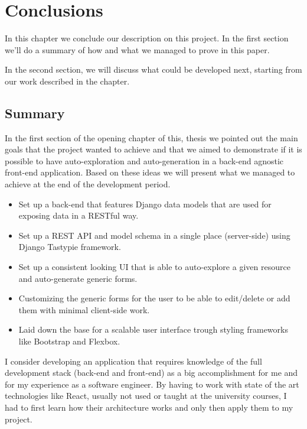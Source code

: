 \chapter{Conclusions}
\label{chapter:conclusions}

In this chapter we conclude our description on this project. In the first section  we'll do a summary of how and what we managed to prove in this paper.

In the second section,  we will discuss what could be developed next, starting from our work described in the  chapter.

\section{Summary}
\label{sec:summary}

In the first section of the opening chapter of this, thesis we pointed out the main goals that the project wanted to achieve and that we aimed to demonstrate if it is possible to have auto-exploration and auto-generation in a back-end agnostic front-end application. Based on these ideas we will present what we managed to achieve at the end of the development period.

\begin{itemize}
	\item Set up a back-end that features Django data models that are used for exposing data in a RESTful way.
	\item Set up a REST API and model schema in a single place (server-side) using Django Tastypie framework.
	\item Set up a consistent looking UI that is able to auto-explore a given resource and auto-generate generic forms.
	\item Customizing the generic forms for the user to be able to edit/delete or add them with minimal client-side work.
	\item Laid down the base for a scalable user interface trough styling frameworks like Bootstrap and Flexbox.
\end{itemize}

I consider developing an application that requires knowledge of the full development stack (back-end and front-end) as a big accomplishment for me and for my experience as a software engineer. By having to work with state of the art technologies like React, usually not used or taught at the university courses, I had to first learn how their architecture works and only then apply them to my project.

